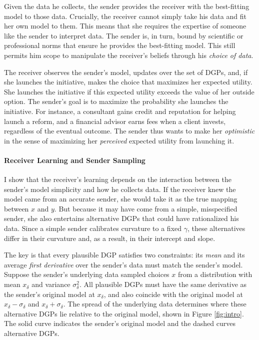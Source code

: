 \documentclass[11pt,dvipsnames]{article}
\begin{document}
Given the data he collects, the sender provides the receiver with the best-fitting model to those data.
Crucially, the receiver cannot simply take his data and fit her own model to them.
This means that she requires the expertise of someone like the sender to interpret data.
The sender is, in turn, bound by scientific or professional norms that ensure he provides the best-fitting model.
This still permits him scope to manipulate the receiver's beliefs through his  \emph{choice of data}.

The receiver observes the sender's model, updates over the set of DGPs, and, if she launches the initiative, makes the choice that maximizes her expected utility.
She launches the initiative if this expected utility exceeds the value of her outside option.
The sender's goal is to maximize the probability she launches the initiative.
For instance, a consultant gains credit and reputation for helping launch a reform, and a financial advisor earns fees when a client invests, regardless of the eventual outcome.
The sender thus wants to make her \emph{optimistic} in the sense of maximizing her \emph{perceived} expected utility from launching it.


\paragraph{Receiver Learning and Sender Sampling}
I show that the receiver's learning depends on the interaction between the sender's model simplicity and how he collects data.
If the receiver knew the model came from an accurate sender, she would take it as the true mapping between $x$ and $y$.
But because it may have come from a simple, misspecified sender, she also entertains alternative DGPs that could have rationalized his data.
Since a simple sender calibrates curvature to a fixed $\gamma$, these alternatives differ in their curvature and, as a result, in their intercept and slope.

The key is that every plausible DGP satisfies two constraints: its \emph{mean} and its average \emph{first derivative} over the sender's data must match the sender's model.
Suppose the sender's underlying data sampled choices $x$ from a distribution with mean $x_\delta$ and variance $\sigma_\delta^2$.
All plausible DGPs must have the same derivative as the sender's original model at $x_\delta$, and also coincide with the original model at $x_\delta - \sigma_\delta$ and $x_\delta + \sigma_\delta$.
The spread of the underlying data determines where these alternative DGPs lie relative to the original model, shown in Figure \ref{fig:intro}.
The solid curve indicates the sender's original model and the dashed curves alternative DGPs. 
\end{document}
